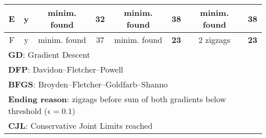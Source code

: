 \begin{table}[!h]
{\begin{tabular}{|c|c|c|c|c|c|c|c|}
			E                                                & y                                    & minim. found           & \cellcolor[HTML]{34FF34}\textbf{32} & minim. found           & 38                                  & minim. found           & 38                                  \\ \hline
			F                                                & y                                    & minim. found           & 37                                  & minim. found           & \cellcolor[HTML]{34FF34}\textbf{23} & 2 zigzags              & \cellcolor[HTML]{34FF34}\textbf{23} \\ \hline
			
			
			\multicolumn{8}{l}{\textbf{GD}: Gradient Descent}\\
			\multicolumn{8}{l}{\textbf{DFP}: Davidon–Fletcher–Powell}\\
			\multicolumn{8}{l}{\textbf{BFGS}: Broyden–Fletcher–Goldfarb–Shanno}\\
			\multicolumn{8}{l}{\textbf{Ending reason}: zigzags before sum of both gradients below threshold ($\mathrm{\epsilon=0.1}$)}\\
			\multicolumn{8}{l}{\textbf{CJL}: Conservative Joint Limits reached}\\
		\end{tabular}%
			} 
\end{table}


